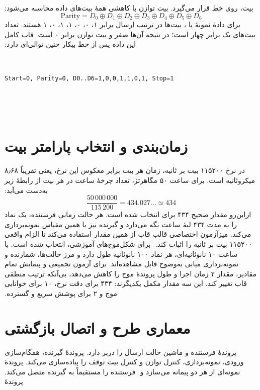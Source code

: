 ‫بیت، روی خط قرار می‌گیرد. بیت توازن با 
‫کاهشی همهٔ بیت‌های داده محاسبه می‌شود:
‫
‫\begin{equation}
‫\mathrm{Parity}=D_0 \oplus D_1 \oplus D_2 \oplus D_3 \oplus D_4 \oplus D_5 \oplus D_6
‫\end{equation}
‫
‫برای دادهٔ نمونهٔ  یا ، بیت‌ها در ترتیب ارسال برابر ۱، ۰، ۰،
‫۱، ۱، ۰، ۱ هستند. تعداد بیت‌های یک برابر چهار است؛ در نتیجه  آن‌ها صفر و بیت
‫توازن برابر ۰ است. قاب کامل این داده پس از خط بیکار چنین توالی‌ای دارد:
‫
‫\begin{latin}
‫\begin{center}
‫\texttt{Start=0, Parity=0, D0..D6=1,0,0,1,1,0,1, Stop=1}
‫\end{center}
‫\end{latin}
‫
‫
‫\section{زمان‌بندی و انتخاب پارامتر بیت}
‫
‫در نرخ ۱۱۵۲۰۰ بیت بر ثانیه، زمان هر بیت برابر معکوس این نرخ، یعنی تقریباً ۸٫۶۸
‫میکروثانیه است. برای ساعت ۵۰ مگاهرتز، تعداد چرخهٔ ساعت در هر بیت از رابطهٔ زیر به‌دست
‫می‌آید:
‫
‫\begin{equation}
‫\frac{50\,000\,000}{115\,200}=434.027\ldots \simeq 434
‫\end{equation}
‫
‫ازاین‌رو مقدار صحیح ۴۳۴ برای  انتخاب شده است. هر حالت زمانی فرستنده، یک
‫نماد را به مدت ۴۳۴ لبهٔ ساعت نگه می‌دارد و گیرنده نیز با همین مقیاس نمونه‌برداری می‌کند.
‫میزآزمون اختصاصی قالب قاب از همین مقدار استفاده می‌کند تا الزام واقعی ۱۱۵۲۰۰ بیت بر
‫ثانیه را اثبات کند.
‫
‫برای شکل‌موج‌های آموزشی،  انتخاب شده است. با ساعت ۱۰ نانوثانیه‌ای،
‫هر نماد ۱۰۰ نانوثانیه طول دارد و مرز حالت‌ها، شمارنده و نمونه‌برداری میانی به‌وضوح قابل
‫مشاهده‌اند. برای آزمون تجمیعی و پیمایش تمام مقادیر، مقدار ۲ زمان اجرا و طول پروندهٔ موج
‫را کاهش می‌دهد، بی‌آنکه ترتیب منطقی قاب تغییر کند. این سه مقدار مکمل یکدیگرند: ۴۳۴ برای
‫دقت نرخ، ۱۰ برای خوانایی موج و ۲ برای پوشش سریع و گسترده.
‫
‫
‫\section{معماری طرح و اتصال بازگشتی}
‫
‫پروندهٔ  فرستنده و ماشین
‫حالت ارسال را دربر دارد. پروندهٔ 
‫گیرنده، همگام‌سازی ورودی،
‫نمونه‌برداری، کنترل توازن و کنترل بیت توقف را پیاده‌سازی می‌کند.
‫پروندهٔ  نمونه‌ای از هر دو پیمانه می‌سازد و
‫ فرستنده را مستقیماً به  گیرنده متصل می‌کند. پروندهٔ 
